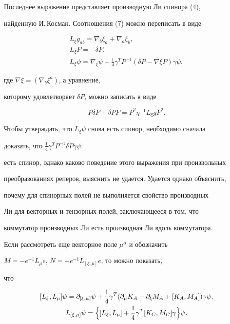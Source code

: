 Последнее выражение представляет производную Ли спинора (4),


найденную И.\,Косман. Соотношения (7) можно переписать в виде


\begin{gather*}


L_\xi g_{ab}=\nabla_b\xi _a+\nabla_a\xi_b, \\


L_\xi P=-\delta P, \\


L_\xi\psi=\nabla_\xi \psi+\frac{1}{4}\gamma^TP^{-1}(


\delta P -\nabla\xi P)\gamma\psi,


\end{gather*}


где $\nabla\xi=(\nabla_b\xi^a)$, а уравнение,


которому удовлетворяет $\delta P$, можно записать в виде


$$


P\delta P+\delta P P=P^2\eta^{-1}L_\xi gP^2.


$$





Чтобы утверждать, что $L_\xi \psi$ снова есть спинор, необходимо сначала


доказать, что $\frac{1}{4}\gamma^TP^{-1}\delta P\gamma \psi$


есть спинор, однако каково поведение этого выражения при произвольных


преобразованиях реперов, выяснить не удается. Удается однако объяснить,


почему для спинорных полей не выполняется свойство производных


Ли для векторных и тензорных полей, заключающееся в том, что


коммутатор производных Ли есть производная Ли вдоль коммутатора.





Если рассмотреть еще векторное поле $\mu^\alpha$ и обозначить


$M=-e^{-1}L_\mu e$, $N=-e^{-1}L_{[\xi,\mu]}e$, то можно показать,


что


\begin{gather}


[L_\xi,L_\mu]\psi=\partial_{[\xi,\psi]}\psi+\frac{1}{4}\gamma^T


(\partial_\mu K_A-\partial_\xi M_A+[K_A,M_A])\gamma\psi, \notag\\


L_{[\xi,\mu]}\psi=\Bigl\{[L_\xi,L_\mu]+\frac{1}{4}\gamma^T[K_C,M_C]


\gamma\Bigr\}\psi.


\end{gather}


